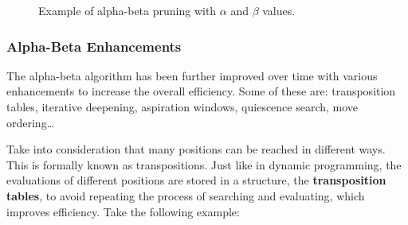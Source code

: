 \begin{figure}[H]

    \caption{Example of alpha-beta pruning with $\alpha$ and $\beta$ values.}
    \label{fig:alpha-beta-pruning-with-alpha-beta-values}
\end{figure}

\subsubsection{Alpha-Beta Enhancements}

The alpha-beta algorithm has been further improved over time with various enhancements to increase the overall efficiency. Some of these are: transposition tables, iterative deepening, aspiration windows, quiescence search, move ordering\ldots

\vspace{1em}

\noindent Take into consideration that many positions can be reached in different ways. This is formally known as transpositions. Just like in dynamic programming, the evaluations of different positions are stored in a structure, the \textbf{transposition tables}, to avoid repeating the process of searching and evaluating, which improves efficiency. Take the following example:

\vspace{-2em}


